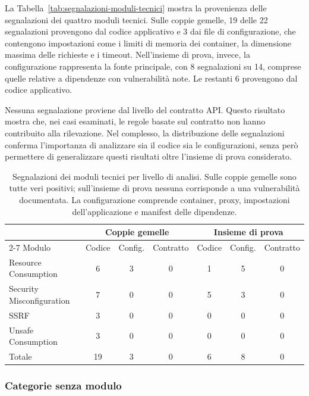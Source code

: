 La Tabella~\ref{tab:segnalazioni-moduli-tecnici} mostra la provenienza delle segnalazioni dei quattro moduli tecnici. Sulle coppie gemelle, 19 delle 22 segnalazioni provengono dal codice applicativo e 3 dai file di configurazione, che contengono impostazioni come i limiti di memoria dei container, la dimensione massima delle richieste e i timeout. Nell'insieme di prova, invece, la configurazione rappresenta la fonte principale, con 8 segnalazioni su 14, comprese quelle relative a dipendenze con vulnerabilità note. Le restanti 6 provengono dal codice applicativo.

Nessuna segnalazione proviene dal livello del contratto API. Questo risultato mostra che, nei casi esaminati, le regole basate sul contratto non hanno contribuito alla rilevazione. Nel complesso, la distribuzione delle segnalazioni conferma l'importanza di analizzare sia il codice sia le configurazioni, senza però permettere di generalizzare questi risultati oltre l'insieme di prova considerato.

\begin{table}[htbp]
    \centering
    \caption{Segnalazioni dei moduli tecnici per livello di analisi. Sulle coppie gemelle sono tutte veri positivi; sull'insieme di prova nessuna corrisponde a una vulnerabilità documentata. La configurazione comprende container, proxy, impostazioni dell'applicazione e manifest delle dipendenze.}
    \label{tab:segnalazioni-moduli-tecnici}
    \label{tab:ris-livelli}
    \begin{tabular}{lccc|ccc}
        \hline
        & \multicolumn{3}{c|}{Coppie gemelle} & \multicolumn{3}{c}{Insieme di prova} \\
        \cline{2-7}
        Modulo & Codice & Config. & Contratto & Codice & Config. & Contratto \\
        \hline
        Resource Consumption & 6 & 3 & 0 & 1 & 5 & 0 \\
        Security Misconfiguration & 7 & 0 & 0 & 5 & 3 & 0 \\
        SSRF & 3 & 0 & 0 & 0 & 0 & 0 \\
        Unsafe Consumption & 3 & 0 & 0 & 0 & 0 & 0 \\
        \hline
        Totale & 19 & 3 & 0 & 6 & 8 & 0 \\
        \hline
    \end{tabular}
\end{table}

\subsubsection{Categorie senza modulo}
\label{sec:ris-scoperte}

